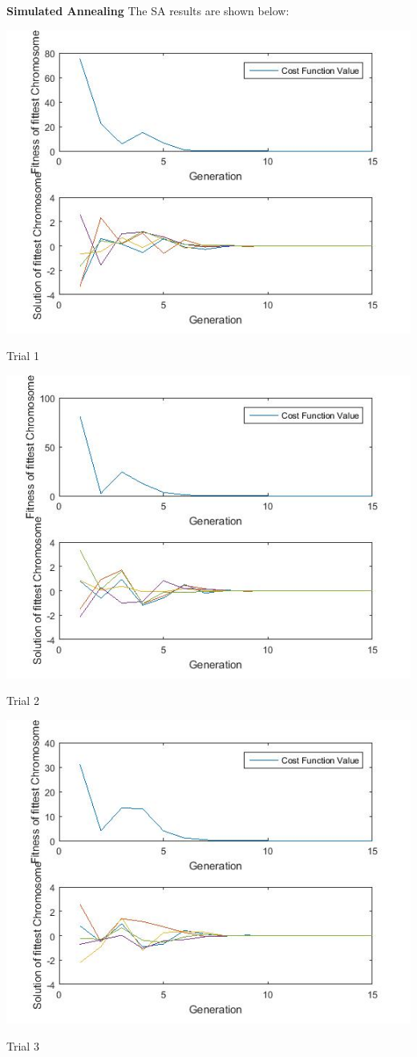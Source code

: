 \documentclass{article}
\begin{document}
\textbf{Simulated Annealing} The SA results are shown below:\\
\centerline{\includegraphics[width=0.5\linewidth]{sa_tf2_a}}
\centerline{Trial 1}
\centerline{\includegraphics[width=0.5\linewidth]{sa_tf2_b}}
\centerline{Trial 2}
\centerline{\includegraphics[width=0.5\linewidth]{sa_tf2_c}}
\centerline{Trial 3}
\end{document}
